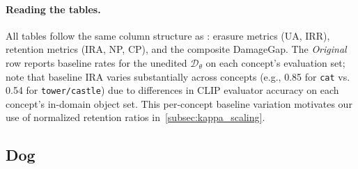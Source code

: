 \paragraph{Reading the tables.}
All tables follow the same column structure as : erasure metrics (UA, IRR), retention metrics (IRA, NP, CP), and the composite DamageGap. The \emph{Original} row reports baseline rates for the unedited $\mathcal{D}_\theta$ on each concept's evaluation set; note that baseline IRA varies substantially across concepts (e.g., {0.85} for \texttt{cat} vs. {0.54} for \texttt{tower/castle}) due to differences in CLIP evaluator accuracy on each concept's in-domain object set. This per-concept baseline variation motivates our use of normalized retention ratios in~\cref{subsec:kappa_scaling}.


\subsection{Dog}
\label{app:per_concept_dog}

